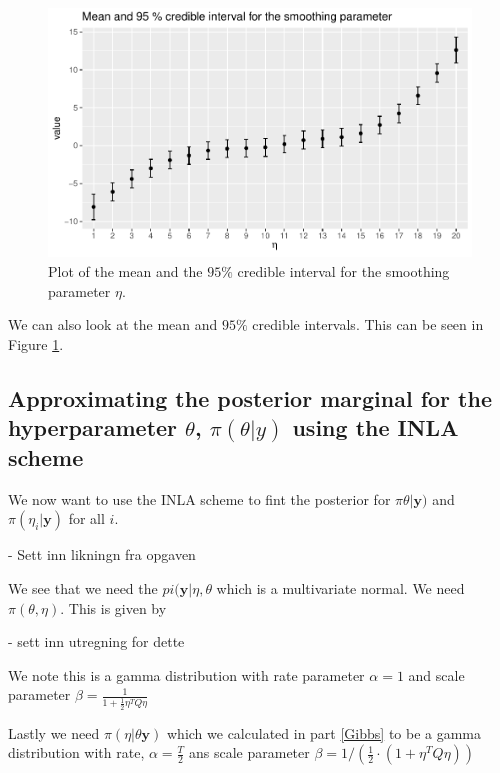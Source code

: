 \begin{figure}[h]
    \centering
    \includegraphics[width=\textwidth]{Images/post_eta_mcmc.pdf}
    \caption{Plot of the mean and the $95\%$ credible interval for the smoothing parameter $\eta$. }
    \label{fig:post_eta_mcmc}
\end{figure}

We can also look at the mean and $95 \%$ credible intervals. This can be seen in Figure \ref{fig:post_eta_mcmc}.


\subsection{Approximating the posterior marginal for the hyperparameter $\theta$, $\pi(\theta|y)$ using the INLA scheme}
\label{theta_post_inla}

We now want to use the INLA scheme to fint the posterior for $\pi\theta| \boldsymbol{y})$ and $\pi(\eta_i| \boldsymbol{y})$ for all $i$.

- Sett inn likningn fra opgaven

We see that we need the $pi(\boldsymbol{y}| \eta, \theta$ which is a multivariate normal. 
We need $\pi(\theta, \eta)$. This is given by 

- sett inn utregning for dette

We note this is a gamma distribution with rate parameter $\alpha = 1$ and scale parameter $\beta = \frac{1}{1 + \frac{1}{2} \eta^{T} Q \eta}$

Lastly we need $\pi(\eta| \theta \boldsymbol{y})$ which we calculated in part \ref{Gibbs} to be a gamma distribution with rate, $\alpha = \frac{T}{2}$ ans scale parameter $\beta = 1/(\frac{1}{2}\cdot (1 + \eta^T Q \eta))$ 

